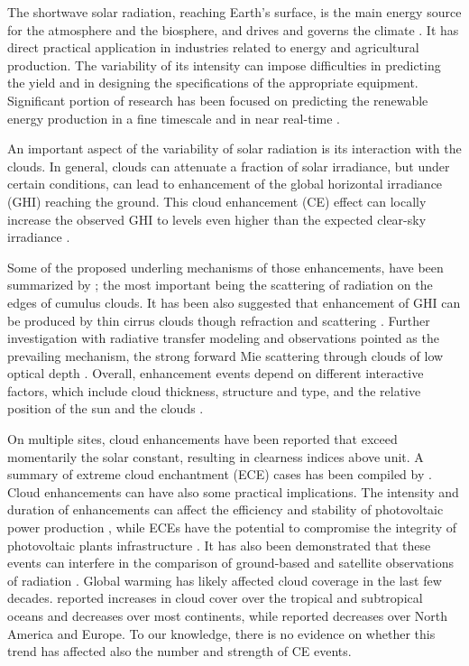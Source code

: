 \documentclass[preprint, 5p,
authoryear]{elsarticle} %
\begin{document}
The shortwave solar radiation, reaching Earth's surface, is the main
energy source for the atmosphere and the biosphere, and drives and
governs the climate \citep{Gray2010}. It has direct practical
application in industries related to energy and agricultural production.
The variability of its intensity can impose difficulties in predicting
the yield and in designing the specifications of the appropriate
equipment. Significant portion of research has been focused on
predicting the renewable energy production in a fine timescale and in
near real-time \citep[for a review see][]{Inman2013, Graabak2016}.

An important aspect of the variability of solar radiation is its
interaction with the clouds. In general, clouds can attenuate a fraction
of solar irradiance, but under certain conditions, can lead to
enhancement of the global horizontal irradiance (GHI) reaching the
ground. This cloud enhancement (CE) effect can locally increase the
observed GHI to levels even higher than the expected clear-sky
irradiance \citep[ and references
therein]{Cordero2023, Vamvakas2020, CastillejoCuberos2020, Vamvakas2020}.

Some of the proposed underling mechanisms of those enhancements, have
been summarized by \citet{Gueymard2017}; the most important being the
scattering of radiation on the edges of cumulus clouds. It has been also
suggested that enhancement of GHI can be produced by thin cirrus clouds
though refraction and scattering \citep{Thuillier2013}. Further
investigation with radiative transfer modeling and observations pointed
as the prevailing mechanism, the strong forward Mie scattering through
clouds of low optical depth
\citep{Pecenak2016, Thuillier2013, Yordanov2013, Yordanov2015}. Overall,
enhancement events depend on different interactive factors, which
include cloud thickness, structure and type, and the relative position
of the sun and the clouds \citep{Gueymard2017, Veerman2022}.

On multiple sites, cloud enhancements have been reported that exceed
momentarily the solar constant, resulting in clearness indices above
unit. A summary of extreme cloud enchantment (ECE) cases has been
compiled by \citet{Martins2022}. Cloud enhancements can have also some
practical implications. The intensity and duration of enhancements can
affect the efficiency and stability of photovoltaic power production
\citep{Lappalainen2020, Jaervelae2020}, while ECEs have the potential to
compromise the integrity of photovoltaic plants infrastructure
\citep{DoNascimento2019}. It has also been demonstrated that these
events can interfere in the comparison of ground-based and satellite
observations of radiation \citep{Damiani2018}. Global warming has likely
affected cloud coverage in the last few decades. \citet{Liu2023}
reported increases in cloud cover over the tropical and subtropical
oceans and decreases over most continents, while \citet{Dong2023}
reported decreases over North America and Europe. To our knowledge,
there is no evidence on whether this trend has affected also the number
and strength of CE events.
\end{document}
